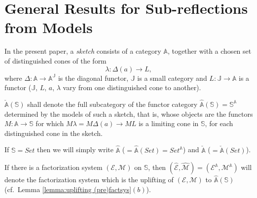 \documentclass[12pt,a4paper]{amsart}
\theoremstyle{definition}
\begin{document}
\section{General Results for Sub-reflections from Models}\label{sec:sub-reflectionsfromodels}

In the present paper, a \emph{sketch} consists of a category $\mathbb{A}$, together with a chosen set of distinguished cones of the form $$\lambda:\Delta (a)\rightarrow L,$$ where $\Delta :\mathbb{\mathbb{A}}\rightarrow \mathbb{A}^\mathbb{J}$ is the diagonal functor, $\mathbb{J}$ is a small category and $L:\mathbb{J}\rightarrow\mathbb{A}$ is a functor ($\mathbb{J}$, $L$, $a$, $\lambda$ vary from one distinguished cone to another).

$\check{\mathbb{A}}(\mathbb{S})$ shall denote the full subcategory of the functor category $\hat{\mathbb{A}}(\mathbb{S})=\mathbb{S}^\mathbb{A}$ determined by the models of such a sketch, that is, whose objects are the functors $M:\mathbb{A}\rightarrow \mathbb{S}$ for which $M\lambda =M\Delta (a)\rightarrow ML$ is a limiting cone in $\mathbb{S}$, for each distinguished cone in the sketch.

If $\mathbb{S}=Set$ then we will simply write $\hat{\mathbb{A}}$ ($=\hat{\mathbb{A}}(Set)=Set^\mathbb{A}$) and $\check{\mathbb{A}}$ ($=\check{\mathbb{A}}(Set)$).

If there is a factorization system $(\mathcal{E},\mathcal{M})$ on $\mathbb{S}$, then $(\mathcal{\hat{E}},\mathcal{\hat{M}})=(\mathcal{E}^\mathbb{A},\mathcal{M}^\mathbb{A})$ will denote the factorization system which is the uplifting of $(\mathcal{E},\mathcal{M})$ to $\hat{\mathbb{A}}(\mathbb{S})$ (cf.\ Lemma \ref{lemma:uplifting (pre)factsys}$(b)$).
\end{document}
